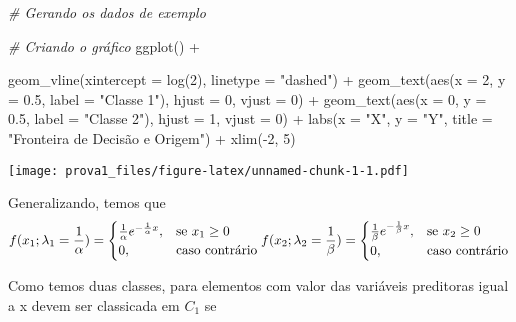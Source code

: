 \documentclass[
]{article}
\newenvironment{Shaded}{\begin{snugshade}}{\end{snugshade}}
\newcommand{\AttributeTok}[1]{\textcolor[rgb]{0.77,0.63,0.00}{#1}}
\newcommand{\CommentTok}[1]{\textcolor[rgb]{0.56,0.35,0.01}{\textit{#1}}}
\newcommand{\DecValTok}[1]{\textcolor[rgb]{0.00,0.00,0.81}{#1}}
\newcommand{\FloatTok}[1]{\textcolor[rgb]{0.00,0.00,0.81}{#1}}
\newcommand{\FunctionTok}[1]{\textcolor[rgb]{0.00,0.00,0.00}{#1}}
\newcommand{\NormalTok}[1]{#1}
\newcommand{\SpecialCharTok}[1]{\textcolor[rgb]{0.00,0.00,0.00}{#1}}
\newcommand{\StringTok}[1]{\textcolor[rgb]{0.31,0.60,0.02}{#1}}
\begin{document}
\begin{Shaded}
\begin{Highlighting}[]
\CommentTok{\# Gerando os dados de exemplo}

\CommentTok{\# Criando o gráfico}
\FunctionTok{ggplot}\NormalTok{() }\SpecialCharTok{+}

  \FunctionTok{geom\_vline}\NormalTok{(}\AttributeTok{xintercept =} \FunctionTok{log}\NormalTok{(}\DecValTok{2}\NormalTok{), }\AttributeTok{linetype =} \StringTok{"dashed"}\NormalTok{) }\SpecialCharTok{+}
  \FunctionTok{geom\_text}\NormalTok{(}\FunctionTok{aes}\NormalTok{(}\AttributeTok{x =} \DecValTok{2}\NormalTok{, }\AttributeTok{y =} \FloatTok{0.5}\NormalTok{, }\AttributeTok{label =} \StringTok{"Classe 1"}\NormalTok{), }\AttributeTok{hjust =} \DecValTok{0}\NormalTok{, }\AttributeTok{vjust =} \DecValTok{0}\NormalTok{) }\SpecialCharTok{+}
  \FunctionTok{geom\_text}\NormalTok{(}\FunctionTok{aes}\NormalTok{(}\AttributeTok{x =} \DecValTok{0}\NormalTok{, }\AttributeTok{y =} \FloatTok{0.5}\NormalTok{, }\AttributeTok{label =} \StringTok{"Classe 2"}\NormalTok{), }\AttributeTok{hjust =} \DecValTok{1}\NormalTok{, }\AttributeTok{vjust =} \DecValTok{0}\NormalTok{) }\SpecialCharTok{+}
  \FunctionTok{labs}\NormalTok{(}\AttributeTok{x =} \StringTok{"X"}\NormalTok{, }\AttributeTok{y =} \StringTok{"Y"}\NormalTok{, }\AttributeTok{title =} \StringTok{"Fronteira de Decisão e Origem"}\NormalTok{) }\SpecialCharTok{+}
  \FunctionTok{xlim}\NormalTok{(}\SpecialCharTok{{-}}\DecValTok{2}\NormalTok{, }\DecValTok{5}\NormalTok{)}
\end{Highlighting}
\end{Shaded}

\texttt{[image: prova1\_files/figure-latex/unnamed-chunk-1-1.pdf]}

Generalizando, temos que \begin{equation}
f(x_1;\lambda_1 = \frac{1}{\alpha})=
\begin{cases}
\frac{1}{\alpha} e^{-\frac{1}{\alpha} x}, & \text{se}\ x_1 \geq 0 \\
0, & \text{caso contrário}
\end{cases}
\\
f(x_2;\lambda_2 = \frac{1}{\beta})=
\begin{cases}
\frac{1}{\beta}e^{-\frac{1}{\beta} x}, & \text{se}\ x_2 \geq 0 \\
0, & \text{caso contrário}
\end{cases}
\end{equation}

Como temos duas classes, para elementos com valor das variáveis
preditoras igual a x devem ser classicada em \(C_1\) se
\end{document}

